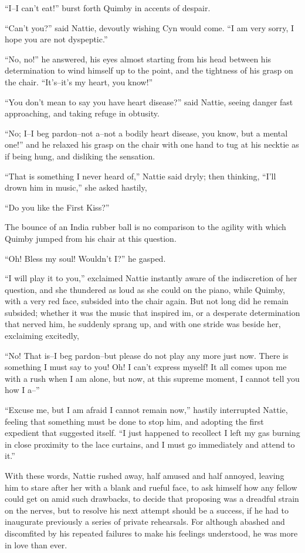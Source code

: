 ``I--I can't eat!'' burst forth Quimby in accents of despair.

``Can't you?'' said Nattie, devoutly wishing Cyn would come. ``I am very
sorry, I hope you are not dyspeptic.''

``No, no!'' he answered, his eyes almost starting from his head between
his determination to wind himself up to the point, and the tightness of
his grasp on the chair. ``It's--it's my heart, you know!''

``You don't mean to say you have heart disease?'' said Nattie, seeing
danger fast approaching, and taking refuge in obtusity.

``No; I--I beg pardon--not a--not a bodily heart disease, you know, but a
mental one!'' and he relaxed his grasp on the chair with one hand to tug
at his necktie as if being hung, and disliking the sensation.

``That is something I never heard of,'' Nattie said dryly; then thinking,
``I'll drown him in music,'' she asked hastily,

``Do you like the First Kiss?''

The bounce of an India rubber ball is no comparison to the agility with
which Quimby jumped from his chair at this question.

``Oh! Bless my soul! Wouldn't I?'' he gasped.

``I will play it to you,'' exclaimed Nattie instantly aware of the
indiscretion of her question, and she thundered as loud as she could on
the piano, while Quimby, with a very red face, subsided into the chair
again. But not long did he remain subsided; whether it was the music
that inspired im, or a desperate determination that nerved him, he
suddenly sprang up, and with one stride was beside her, exclaiming
excitedly,

``No! That is--I beg pardon--but please do not play any more just now.
There is something I must say to you! Oh! I can't express myself! It all
comes upon me with a rush when I am alone, but now, at this supreme
moment, I cannot tell you how I a--''

``Excuse me, but I am afraid I cannot remain now,'' hastily interrupted
Nattie, feeling that something must be done to stop him, and adopting
the first expedient that suggested itself. ``I just happened to recollect
I left my gas burning in close proximity to the lace curtains, and I
must go immediately and attend to it.''

With these words, Nattie rushed away, half amused and half annoyed,
leaving him to stare after her with a blank and rueful face, to ask
himself how any fellow could get on amid such drawbacks, to decide that
proposing was a dreadful strain on the nerves, but to resolve his next
attempt should be a success, if he had to inaugurate previously a series
of private rehearsals. For although abashed and discomfited by his
repeated failures to make his feelings understood, he was more in love
than ever.

